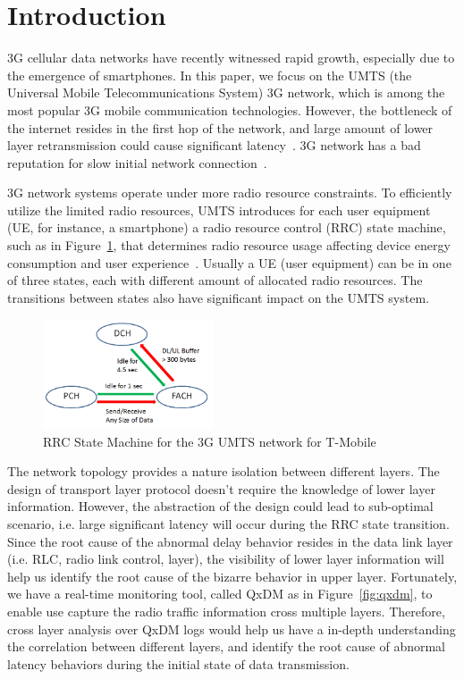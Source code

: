 \section{Introduction}


3G cellular data networks have recently witnessed rapid growth, especially due to the emergence of smartphones. In this paper, we focus on the UMTS (the Universal Mobile Telecommunications System) 3G network, which is among the most popular 3G mobile communication technologies. However, the bottleneck of the internet resides in the first hop of the network, and large amount of lower layer retransmission could cause significant latency~\cite{bufferbloat}. 3G network has a bad reputation for slow initial network connection~\cite{3g.slow}.

3G network systems operate under more radio resource constraints. To efficiently utilize the limited radio resources, UMTS introduces for each user equipment (UE, for instance, a smartphone) a radio resource control (RRC) state machine, such as in Figure~\ref{fig:rrc.state.machine}, that determines radio resource usage affecting device energy consumption and user experience~\cite{spec-3G-RRC}. Usually a UE (user equipment) can be in one of three states, each with different amount of allocated radio resources. The transitions between states also have significant impact on the UMTS system. 

\begin{figure}
\centering
\includegraphics[width=0.45\textwidth]{figs/rrc_state.png}
\caption{RRC State Machine for the 3G UMTS network for T-Mobile}
\label{fig:rrc.state.machine}
\end{figure}

The network topology provides a nature isolation between different layers. The design of transport layer protocol doesn't require the knowledge of lower layer information. However, the abstraction of the design could lead to sub-optimal scenario, i.e. large significant latency will occur during the RRC state transition. Since the root cause of the abnormal delay behavior resides in the data link layer (i.e. RLC, radio link control, layer), the visibility of lower layer information will help us identify the root cause of the bizarre behavior in upper layer. Fortunately, we have a real-time monitoring tool, called QxDM as in Figure~\ref{fig:qxdm}, to enable use capture the radio traffic information cross multiple layers. Therefore, cross layer analysis over QxDM logs would help us have a in-depth understanding the correlation between different layers, and identify the root cause of abnormal latency behaviors during the initial state of data transmission.

